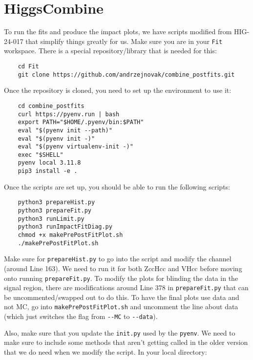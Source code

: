 \section{HiggsCombine}

To run the fits and produce the impact plots, we have scripts modified from HIG-24-017 that simplify things greatly for us. Make sure you are in your \verb|Fit| workspace. There is a special repository/library that is needed for this:

\begin{verbatim}
    cd Fit
    git clone https://github.com/andrzejnovak/combine_postfits.git
\end{verbatim}

\noindent Once the repository is cloned, you need to set up the environment to use it:

\begin{verbatim}
    cd combine_postfits
    curl https://pyenv.run | bash 
    export PATH="$HOME/.pyenv/bin:$PATH"
    eval "$(pyenv init --path)"
    eval "$(pyenv init -)"
    eval "$(pyenv virtualenv-init -)"
    exec "$SHELL"
    pyenv local 3.11.8
    pip3 install -e .
\end{verbatim}

\noindent Once the scripts are set up, you should be able to run the following scripts:

\begin{verbatim}
    python3 prepareHist.py
    python3 prepareFit.py
    python3 runLimit.py
    python3 runImpactFitDiag.py
    chmod +x makePrePostFitPlot.sh
    ./makePrePostFitPlot.sh
\end{verbatim}

\noindent Make sure for \verb|prepareHist.py| to go into the script and modify the channel (around Line 163). We need to run it for both ZccHcc and VHcc before moving onto running \verb|prepareFit.py|. To modify the plots for blinding the data in the signal region, there are modifications around Line 378 in \verb|prepareFit.py| that can be uncommented/swapped out to do this. To have the final plots use data and not MC, go into \verb|makePrePostFitPlot.sh| and uncomment the line about data (which just switches the flag from \verb|--MC| to \verb|--data|).

Also, make sure that you update the \verb|init.py| used by the \verb|pyenv|. We need to make sure to include some methods that aren't getting called in the older version that we do need when we modify the script. In your local directory:

